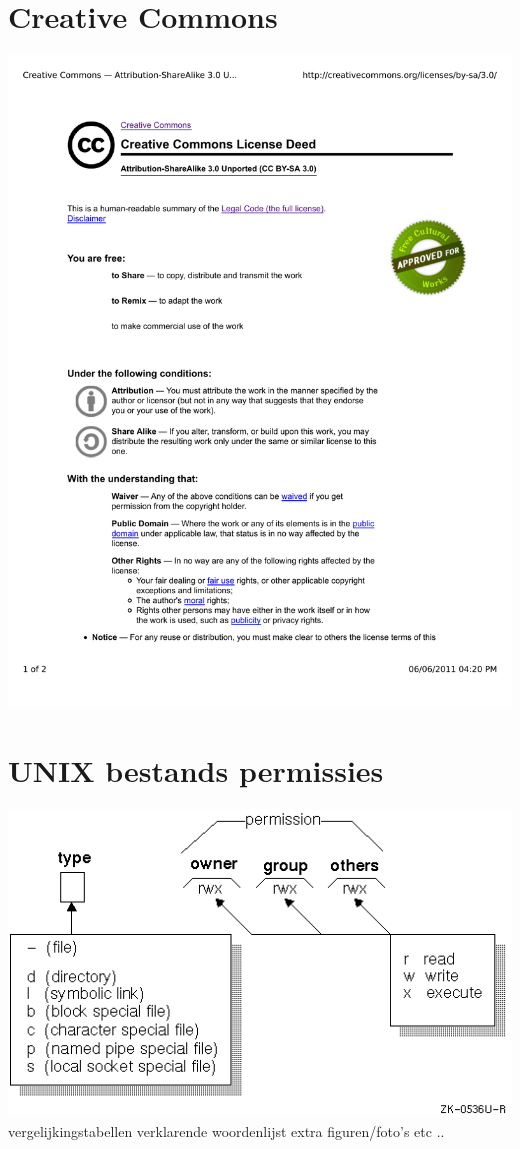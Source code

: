 \chapter{Creative Commons}
\includegraphics[scale=0.6]{src/cc-by-sa.pdf}
\chapter{UNIX bestands permissies}
\includegraphics[scale=0.7]{src/unix_file_permissions.png}
vergelijkingstabellen
verklarende woordenlijst
extra figuren/foto's
etc ..
